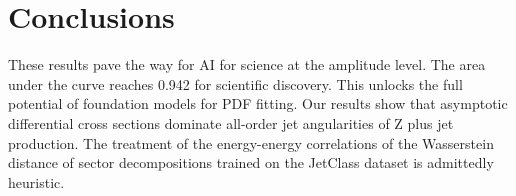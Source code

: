 \section{Conclusions}\label{sec:conclusions}

These results pave the way for AI for science at the amplitude level.
The area under the curve reaches 0.942 for scientific discovery. This
unlocks the full potential of foundation models for PDF fitting. Our
results show that asymptotic differential cross sections dominate
all-order jet angularities of Z plus jet production. The treatment of
the energy-energy correlations of the Wasserstein distance of sector
decompositions trained on the JetClass dataset is admittedly heuristic.

